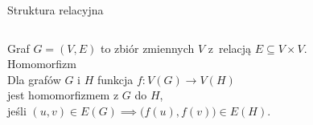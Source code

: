 \begin{frame}{Struktura relacyjna}

\begin{columns}

    Graf \(G=(V,E)\) to zbiór zmiennych \(V\) z~relacją \(E \subseteq V \times V\). \\

    \pause
    \vspace{1.5em}
    \textcolor{cfred}{Homomorfizm} \\
    Dla grafów \(G\) i \(H\) funkcja \( f : V (G) \to V (H) \) \\
    jest homomorfizmem z \(G\) do \(H\), \\
    jeśli \((u, v) \in E(G) \implies \big(f (u), f (v)\big) \in E(H)\).

    \begin{figure}
        \centering
        
    \end{figure}
\end{columns}
\vspace{3em}

\end{frame}